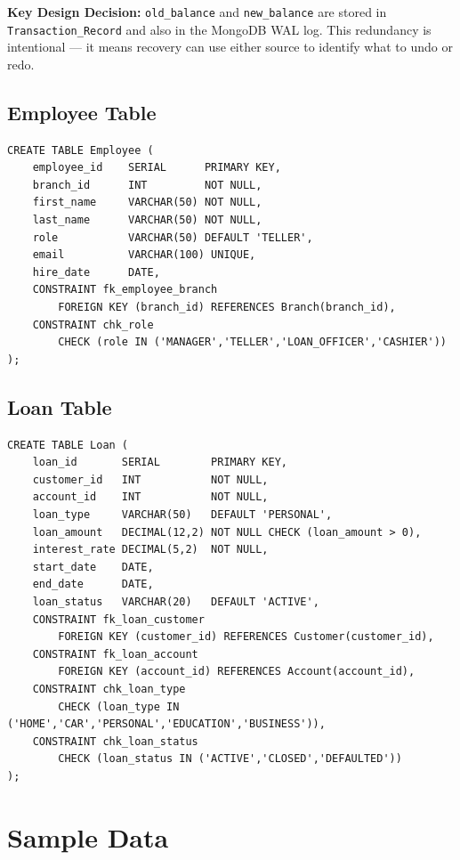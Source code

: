 \begin{conceptbox}
\textbf{Key Design Decision:} \texttt{old\_balance} and \texttt{new\_balance}
are stored in \texttt{Transaction\_Record} and also in the MongoDB WAL log.
This redundancy is intentional --- it means recovery can use either source
to identify what to undo or redo.
\end{conceptbox}

\subsection{Employee Table}

\begin{lstlisting}[style=sqlstyle, caption={Employee Table}]
CREATE TABLE Employee (
    employee_id    SERIAL      PRIMARY KEY,
    branch_id      INT         NOT NULL,
    first_name     VARCHAR(50) NOT NULL,
    last_name      VARCHAR(50) NOT NULL,
    role           VARCHAR(50) DEFAULT 'TELLER',
    email          VARCHAR(100) UNIQUE,
    hire_date      DATE,
    CONSTRAINT fk_employee_branch
        FOREIGN KEY (branch_id) REFERENCES Branch(branch_id),
    CONSTRAINT chk_role
        CHECK (role IN ('MANAGER','TELLER','LOAN_OFFICER','CASHIER'))
);
\end{lstlisting}

\subsection{Loan Table}

\begin{lstlisting}[style=sqlstyle, caption={Loan Table}]
CREATE TABLE Loan (
    loan_id       SERIAL        PRIMARY KEY,
    customer_id   INT           NOT NULL,
    account_id    INT           NOT NULL,
    loan_type     VARCHAR(50)   DEFAULT 'PERSONAL',
    loan_amount   DECIMAL(12,2) NOT NULL CHECK (loan_amount > 0),
    interest_rate DECIMAL(5,2)  NOT NULL,
    start_date    DATE,
    end_date      DATE,
    loan_status   VARCHAR(20)   DEFAULT 'ACTIVE',
    CONSTRAINT fk_loan_customer
        FOREIGN KEY (customer_id) REFERENCES Customer(customer_id),
    CONSTRAINT fk_loan_account
        FOREIGN KEY (account_id) REFERENCES Account(account_id),
    CONSTRAINT chk_loan_type
        CHECK (loan_type IN ('HOME','CAR','PERSONAL','EDUCATION','BUSINESS')),
    CONSTRAINT chk_loan_status
        CHECK (loan_status IN ('ACTIVE','CLOSED','DEFAULTED'))
);
\end{lstlisting}

\section{Sample Data}

